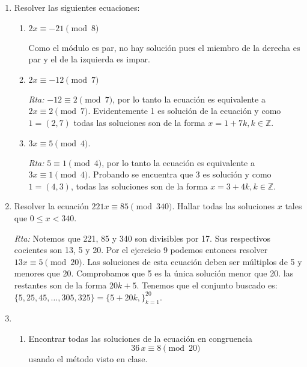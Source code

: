 \documentclass[a4paper,12pt,twoside,spanish,reqno]{amsbook}
\numberwithin{equation}{section}
\newcommand{\rta}{\noindent\textit{Rta: }}
\begin{document}
\begin{enumerate}
    \rta La ecuación $\frac{a}{d}\cdot x \equiv \frac{b}{d} \pmod{\frac{m}{d}}$
    tiene solución si y sólo si $\frac{m}{d}\vert \frac{a}{d}\cdot x - \frac{b}{d}$ si y sólo si $\frac{a}{d}\cdot x - \frac{b}{d}=\frac{m}{d}q$ como $d\neq0$ multiplicando por $d$, esto ocurre si y sólo si $m\vert a \cdot x - b $, es decir, $a \cdot x \equiv b \pmod{m}$.
    
    
    
    \item Resolver las siguientes ecuaciones:
    \begin{enumerate}
        \item $2x \equiv -21 \pmod{8}$ 
        
        Como el módulo es par, no hay solución pues el miembro de la derecha es par y el de la izquierda es impar.
        
        \item $2x \equiv -12 \pmod{7} $
        
        \rta  $-12 \equiv 2 \pmod{7}$, por lo tanto la ecuación es equivalente a $2x \equiv 2 \pmod{7}$. Evidentemente 1 es solución de la ecuación y como $1=(2,7)$ todas las soluciones son de la forma $x=1+7k, k\in\mathbb{Z}$.
        
        \item $3x \equiv 5 \pmod{4}.$
        
        \rta   $5 \equiv 1 \pmod{4}$, por lo tanto la ecuación es equivalente a $3x \equiv 1 \pmod{4}$. Probando se encuentra que 3 es solución y como $1=(4,3)$, todas las soluciones son de la forma $x=3+4k, k\in\mathbb{Z}$.
    \end{enumerate}

    
    \item Resolver la ecuación $221 x \equiv 85\pmod{340}$. Hallar todas las soluciones $x$ tales que $0 \le x < 340$.
        
    \rta Notemos que 221, 85 y 340 son divisibles por 17.  Sus respectivos cocientes son 13, 5 y 20.
    Por el ejercicio 9 podemos entonces resolver $13x\equiv 5 \pmod{20}$. Las soluciones de esta ecuación deben ser múltiplos de 5 y menores que 20. Comprobamos que 5 es la única solución menor que 20.
    las restantes son de la forma $20k+5$. Tenemos que el conjunto buscado es: $\{5, 25, 45, \dots,305, 325\}=\{5+20k,\}_{k=1}^{20}$.
    
    
    \item 
    \begin{enumerate}
        \item Encontrar todas las soluciones de la ecuación en congruencia
        $$36\,x\equiv 8 \pmod{20}$$
        usando el método visto en clase.
            

\end{enumerate}
\end{enumerate}
\end{document}
